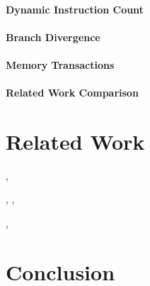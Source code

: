 \documentclass[conference, 10pt]{IEEEtran}
\begin{document}
\paragraph{Dynamic Instruction Count}

\paragraph{Branch Divergence}

\paragraph{Memory Transactions}

\paragraph{Related Work Comparison}



\section{Related Work}
\label{sec:related-work}

\cite{ref:ptl-sim}, \cite{ref:simple-scalar}



\cite{ref:ramp}

\cite{ref:ocelot-pact}

\cite{ref:pdes}, \cite{ref:multi-threaded-sim},
\cite{ref:cuda-simulation-of-many-core}

\cite{ref:verilog-cuda}, \cite{ref:bluespec} 

\cite{ref:lynx}


\section{Conclusion}
\label{sec:conclusion}




\end{document}
